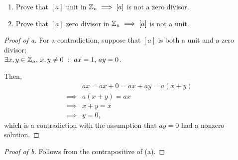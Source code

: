 \documentclass[../hw2]{subfiles}
\begin{document}
\begin{problem}[3]
\begin{enumerate}[label=\alph*)]
	\item Prove that $[a]$ unit in $\mathbb{Z}_n \implies [a]$ is not a zero divisor.
	\item Prove that $[a]$ zero divisor in $\mathbb{Z}_n \implies [a]$ is not a unit.
\end{enumerate}
\end{problem}
\begin{proof}[Proof of a]
	For a contradiction, suppose that $[a]$ is both a unit and a zero divisor; \\
	$\exists x,y \in \mathbb{Z}_n,\, x,y\neq 0\ :\ ax=1,\, ay=0$.

	Then,
	\begin{align*}
		         & ax=ax+0=ax+ay=a(x+y) \\
		\implies & a(x+y)=ax            \\
		\implies & x+y = x              \\
		\implies & y = 0
		,\end{align*}
	which is a contradiction with the assumption that $ay=0$ had a nonzero solution.
\end{proof}
\begin{proof}[Proof of b]
	Follows from the contrapositive of (a).
\end{proof}
\end{document}
